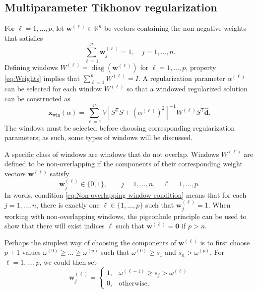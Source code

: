 \documentclass[12pt]{article}
\newcommand{\dVec}{\mathbf{d}}	%
\newcommand{\xVec}{\mathbf{x}}	%
\newcommand{\wVec}{\mathbf{w}}	%
\newcommand{\trans}[1]{{#1}^\mathsf{T}}	%
\newcommand{\inv}[1]{{#1}^{-1}}	%
\DeclareMathOperator{\diag}{diag}	%
\newcommand{\dft}[1]{\widehat{#1}}	%
\newcommand{\regparam}{\alpha}  %
\newcommand{\xWin}{\xVec_{\text{win}}(\regparam)}	%
\newcommand{\zeroVec}{\bm{0}}	%
\newcommand{\singular}{s}	%
\begin{document}
\subsection{Multiparameter Tikhonov regularization} \label{sec:Multiparameter}
For $\ell = 1,\ldots,p$, let $\wVec^{(\ell)} \in \mathbb{R}^n$ be vectors containing the non-negative weights that satisfies
\begin{equation}
\label{eq:Weights}
\sum_{\ell=1}^{p} \wVec_j^{(\ell)} = 1, \quad j = 1,\ldots,n.
\end{equation}
Defining windows $W^{(\ell)} = \diag\left(\wVec^{(\ell)}\right)$ for $\ell = 1,\ldots,p$, property \eqref{eq:Weights} implies that $\sum_{\ell=1}^p W^{(\ell)} = I$.  A regularization parameter $\regparam^{(\ell)}$ can be selected for each window $W^{(\ell)}$ so that a windowed regularized solution can be constructed as
\begin{equation}
\label{eq:TikSolWindow}
\xWin = \sum_{\ell=1}^p V\inv{\left[\trans{S}S + (\regparam^{(\ell)})^2\right]}W^{(\ell)}\trans{S}\dft{\dVec}.
\end{equation}
The windows must be selected before choosing corresponding regularization parameters; as such, some types of windows will be discussed. \par
A specific class of windows are windows that do not overlap. Windows $W^{(\ell)}$ are defined to be non-overlapping if the components of their corresponding weight vectors $\wVec^{(\ell)}$ satisfy
\begin{equation}
\label{eq:Non-overlapping window condition}
    \wVec_j^{(\ell)} \in \{0,1\}, \qquad j = 1,\ldots,n, \quad \ell = 1,\ldots,p.
\end{equation}
In words, condition \eqref{eq:Non-overlapping window condition} means that for each $j = 1,\ldots,n$, there is exactly one $\ell \in \{1,\ldots,p\}$ such that $\wVec_j^{(\ell)} = 1$. When working with non-overlapping windows, the pigeonhole principle \cite{DummitFoote3} can be used to show that there will exist indices $\ell$ such that $\wVec^{(\ell)} = \zeroVec$ if $p > n$. \par
Perhaps the simplest way of choosing the components of $\wVec^{(\ell)}$ is to first choose $p+1$ values $\omega^{(0)} \geq \ldots \geq \omega^{(p)}$ such that $\omega^{(0)} \geq \singular_1$ and $\singular_n > \omega^{(p)}$. For $\ell = 1,\ldots,p$, we could then set
\begin{equation}
\label{eq:Non-overlapping windows}
\wVec_j^{(\ell)} = \begin{cases}
1, & \omega^{(\ell-1)} \geq \singular_j > \omega^{(\ell)} \\
0, & \text{otherwise.}
\end{cases}
\end{equation}
\end{document}
